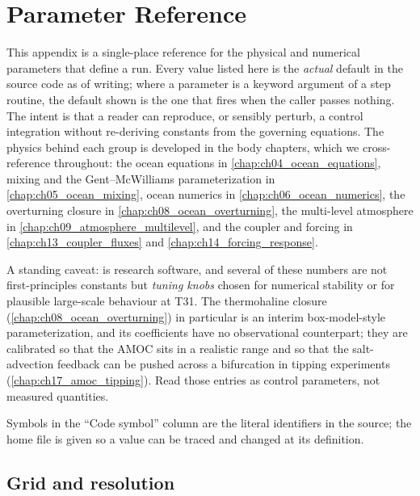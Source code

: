 \chapter{Parameter Reference}\label{chap:appB_parameters}

\providecommand{\val}[1]{\ensuremath{#1}}

This appendix is a single-place reference for the physical and numerical
parameters that define a \model{} run. Every value listed here is the
\emph{actual} default in the source code as of writing; where a parameter is a
keyword argument of a step routine, the default shown is the one that fires when
the caller passes nothing. The intent is that a reader can reproduce, or
sensibly perturb, a control integration without re-deriving constants from the
governing equations. The physics behind each group is developed in the body
chapters, which we cross-reference throughout: the ocean equations in
\ref{chap:ch04_ocean_equations}, mixing and the Gent--McWilliams parameterization
in \ref{chap:ch05_ocean_mixing}, ocean numerics in \ref{chap:ch06_ocean_numerics},
the overturning closure in \ref{chap:ch08_ocean_overturning}, the multi-level
atmosphere in \ref{chap:ch09_atmosphere_multilevel}, and the coupler and forcing
in \ref{chap:ch13_coupler_fluxes} and \ref{chap:ch14_forcing_response}.

A standing caveat: \model{} is research software, and several of these numbers
are not first-principles constants but \emph{tuning knobs} chosen for numerical
stability or for plausible large-scale behaviour at T31. The thermohaline
closure (\ref{chap:ch08_ocean_overturning}) in particular is an interim
box-model-style parameterization, and its coefficients have no observational
counterpart; they are calibrated so that the AMOC sits in a realistic range and
so that the salt-advection feedback can be pushed across a bifurcation in tipping
experiments (\ref{chap:ch17_amoc_tipping}). Read those entries as control
parameters, not measured quantities.

Symbols in the ``Code symbol'' column are the literal identifiers in the source;
the home file is given so a value can be traced and changed at its definition.

\section{Grid and resolution}

